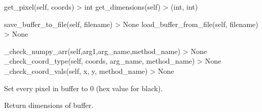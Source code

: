 \documentclass[letterpaper,10pt,english]{sphinxmanual}
\begin{document}
\begin{fulllineitems}
\begin{fulllineitems}
\end{fulllineitems}



\begin{fulllineitems}

\pysigstartsignatures
{}
\pysigstopsignatures
\sphinxAtStartPar
get\_pixel(self, coords) \sphinxhyphen{}\textgreater{} int
get\_dimensions(self) \sphinxhyphen{}\textgreater{} (int, int)

\end{fulllineitems}



\begin{fulllineitems}

\pysigstartsignatures
{}
\pysigstopsignatures
\sphinxAtStartPar
save\_buffer\_to\_file(self, filename) \sphinxhyphen{}\textgreater{} None
load\_buffer\_from\_file(self, filename) \sphinxhyphen{}\textgreater{} None

\end{fulllineitems}



\begin{fulllineitems}

\pysigstartsignatures
{}
\pysigstopsignatures
\sphinxAtStartPar
\_check\_numpy\_arr(self,arg1,arg\_name,method\_name) \sphinxhyphen{}\textgreater{} None
\_check\_coord\_type(self, coords, arg\_name, method\_name) \sphinxhyphen{}\textgreater{} None
\_check\_coord\_vals(self, x, y, method\_name) \sphinxhyphen{}\textgreater{} None

\end{fulllineitems}


\begin{fulllineitems}
\label{\detokenize{dpav:dpav.VBuffer.clear}}
\pysigstartsignatures
{}
\pysigstopsignatures
\sphinxAtStartPar
Set every pixel in buffer to 0 (hex value for black).

\end{fulllineitems}


\begin{fulllineitems}
\label{\detokenize{dpav:dpav.VBuffer.dimensions}}
\pysigstartsignatures
{}
\pysigstopsignatures
\sphinxAtStartPar
Return dimensions of buffer.


\end{fulllineitems}
\end{fulllineitems}
\end{document}
